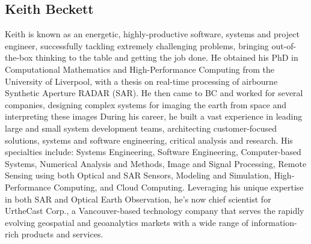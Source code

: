 \subsection*{Keith Beckett}

Keith is known as an energetic, highly-productive software, systems
and project engineer, successfully tackling extremely challenging
problems, bringing out-of-the-box thinking to the table and getting
the job done. He obtained his PhD in Computational Mathematics and
High-Performance Computing from the University of Liverpool, with a
thesis on real-time processing of airbourne Synthetic Aperture
RADAR (SAR). He then came to BC and worked for several companies, designing complex
systems for imaging the earth from space and interpreting these images
During his career, he built a vast experience in leading large and small system
development teams, architecting customer-focused solutions, systems
and software engineering, critical analysis and research. His
specialties include: Systems Engineering, Software Engineering,
Computer-based Systems, Numerical Analysis and Methods, Image and
Signal Processing, Remote Sensing using both Optical and SAR Sensors,
Modeling and Simulation, High-Performance Computing, and Cloud
Computing. Leveraging his unique expertise in both SAR and Optical Earth
Observation, he's now chief scientist for UrtheCast Corp., a Vancouver-based
technology company that serves the rapidly evolving geospatial and
geoanalytics markets with a wide range of information-rich products
and services.

